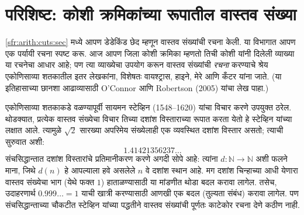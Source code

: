 \documentclass[11pt,a4paper,openany]{book}
\theoremstyle{definition}
\newcommand{\Nat}{\mathbb{N}}
\begin{document}
\section{परिशिष्ट: कोशी क्रमिकांच्या रूपातील वास्तव संख्या}\label{sfr:arith:cauchy:sec}

\ref{sfr:arith:cuts:sec} मध्ये आपण डेडेकिंड छेद म्हणून वास्तव संख्यांची रचना
केली. या विभागात आपण एक पर्यायी रचना स्पष्ट करू. आज आपण जिला कोशी क्रमिका
म्हणतो तिची कोशी यांनी दिलेली व्याख्या या रचनेचा आधार आहे; पण त्या
व्याख्येचा उपयोग करून वास्तव संख्यांची \emph{रचना} करण्याचे श्रेय
एकोणिसाव्या शतकातील इतर लेखकांना, विशेषतः वायश्ट्रास, हाइने, मेरे आणि
कँटर यांना जाते. (या इतिहासाच्या छानशा आढाव्यासाठी
O'Connor आणि Robertson (2005) यांचा लेख पाहा.)

एकोणिसाव्या शतकाकडे वळण्यापूर्वी सायमन स्टेव्हिन (1548--1620) यांचा
विचार करणे उपयुक्त ठरेल. थोडक्यात, प्रत्येक वास्तव संख्येचा विचार तिच्या
दशांश विस्ताराच्या रूपात करता येतो हे स्टेव्हिन यांच्या लक्षात आले.
त्यामुळे $\sqrt{2}$ सारख्या अपरिमेय संख्येलाही एक व्यवस्थित दशांश विस्तार
असतो; त्याची सुरुवात अशी:
\[
	1.41421356237\ldots
\]
संचसिद्धान्तात दशांश विस्तारांचे प्रतिमानीकरण करणे अगदी सोपे आहे: त्यांना
$d \colon \Nat \to \Nat$ अशी फलने माना, जिथे $d(n)$ हे आपल्याला हवे
असलेले $n$ वे दशांश स्थान आहे. मग दशांश चिन्हाच्या आधी येणारा वास्तव
संख्येचा भाग (येथे फक्त $1$) हाताळण्यासाठी या मांडणीत थोडा बदल करावा
लागेल. तसेच, उदाहरणार्थ $0.999\ldots = 1$ याची खात्री करण्यासाठी आणखी
एक बदल (तुल्यता संबंध) करावा लागेल. पण संचसिद्धान्ताच्या चौकटीत
स्टेव्हिन यांच्या पद्धतीने वास्तव संख्यांची पूर्णतः काटेकोर रचना देणे
कठीण नाही.
\end{document}
